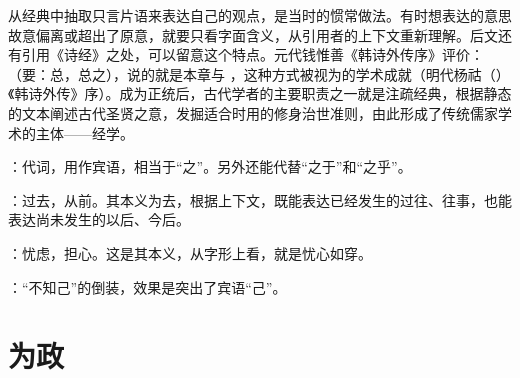 {\begin{lyblobitemize}
从经典中抽取只言片语来表达自己的观点，是当时的惯常做法。有时想表达的意思故意偏离或超出了原意，就要只看字面含义，从引用者的上下文重新理解。后文还有引用《诗经》之处，可以留意这个特点。元代钱惟善《韩诗外传序》评价：（要：总，总之），说的就是本章与 ，这种方式被视为的学术成就（明代杨祜（）《韩诗外传》序）。成为正统后，古代学者的主要职责之一就是注疏经典，根据静态的文本阐述古代圣贤之意，发掘适合时用的修身治世准则，由此形成了传统儒家学术的主体——经学。

\item {}：代词，用作宾语，相当于“之”。另外还能代替“之于”和“之乎”。
\item {}：过去，从前。其本义为去，根据上下文，既能表达已经发生的过往、往事，也能表达尚未发生的以后、今后。
\end{lyblobitemize}
}
{}


{
\item {}：忧虑，担心。这是其本义，从字形上看，就是忧心如穿。
\item {}：“不知己”的倒装，效果是突出了宾语“己”。
}
{}


\chapter{为政}


